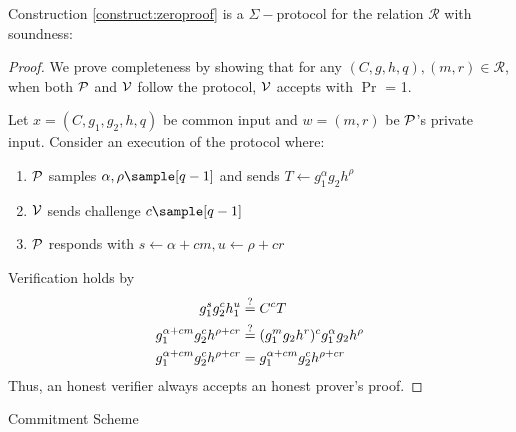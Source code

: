 \begin{theorem}[Soundness]
    Construction \ref{construct:zeroproof} is a $\Sigma-$protocol for the relation $\mathcal{R}$ with soundness: 
\end{theorem}
\begin{proof}
    We prove completeness by showing that for any $(C, g, h, q),(m,r) \in \mathcal{R}$, when both $\mathcal{P}$ and $\mathcal{V}$ follow the protocol, $\mathcal{V}$ accepts with $\Pr$ = 1.

    Let $x = (C,g_1,g_2,h,q)$ be common input and $w = (m, r)$ be $\mathcal{P}$'s private input. Consider an execution of the protocol where:
    \begin{enumerate}
        \item $\mathcal{P}$ samples $\alpha, \rho \sample [q-1]$ and sends $T \gets g_1^{\alpha}g_2h^{\rho}$
        \item $\mathcal{V}$ sends challenge $c \sample [q-1]$
        \item $\mathcal{P}$ responds with $s \gets \alpha+cm, u \gets \rho+cr$
    \end{enumerate}
    Verification holds by 
    \begin{align}
        g_1^sg_2^ch_1^u &\stackrel{?}{=} C^cT \notag \\
        g_1^{\alpha + cm}g_2^ch^{\rho + cr} &\stackrel{?}{=} (g_1^{m}g_2h^r)^c g_1^{\alpha}g_2h^{\rho} \notag \\
        g_1^{\alpha + cm}g_2^ch^{\rho + cr} &= g_1^{\alpha + cm}g_2^c h^{\rho + cr} \notag \\
    \end{align}
    Thus, an honest verifier always accepts an honest prover's proof.
\end{proof}





\newpage
Commitment Scheme
